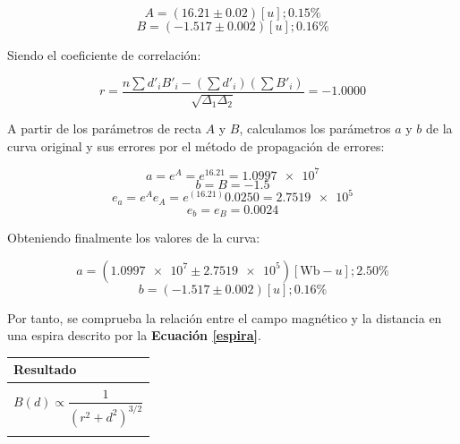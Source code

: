 \documentclass[letter,11pt]{article}
\begin{document}
\begin{equation*}
    A = (16.21 \pm 0.02 )[u]; 0.15 \%
\end{equation*}
\begin{equation*}
    B = (-1.517 \pm 0.002)[u]; 0.16 \%
\end{equation*}

Siendo el coeficiente de correlación:

\begin{equation*}
    r = \frac{n \sum d'_i B'_i - (\sum d'_i)(\sum B'_i)}{\sqrt{\Delta_1 \Delta_2}} = -1.0000
\end{equation*}

A partir de los parámetros de recta $A$ y $B$, calculamos los parámetros $a$ y
$b$ de la curva original y sus errores por el método de propagación de errores:

\begin{equation*}
    a = e^A = e^{16.21} =  \num{1.0997e7}
\end{equation*}
\begin{equation*}
    b = B = -1.5
\end{equation*}
\begin{equation*}
    e_a = e^A e_A = e^{(16.21)} 0.0250 = \num{2.7519e5}
\end{equation*}
\begin{equation*}
    e_b = e_B = 0.0024
\end{equation*}

Obteniendo finalmente los valores de la curva:

\begin{equation*}
    a = (\num{1.0997e7} \pm \num{2.7519e5})[\text{Wb}-u]; 2.50\%
\end{equation*}
\begin{equation*}
    b = (-1.517 \pm 0.002)[u]; 0.16\%
\end{equation*}

Por tanto, se comprueba la relación entre el campo magnético y la distancia en
una espira descrito por la \textbf{Ecuación \ref{espira}}.

\begin{center}
\begin{tabular}{|>{\centering}m{9.2cm}<{\centering}|}
\hline
\textbf{Resultado} 
\tabularnewline \hline
\\
\Large{$B(d) \propto \dfrac{1}{(r^2+d^2)^{3/2}} $} \tabularnewline
\\
\hline
\end{tabular}
\end{center}
\end{document}
